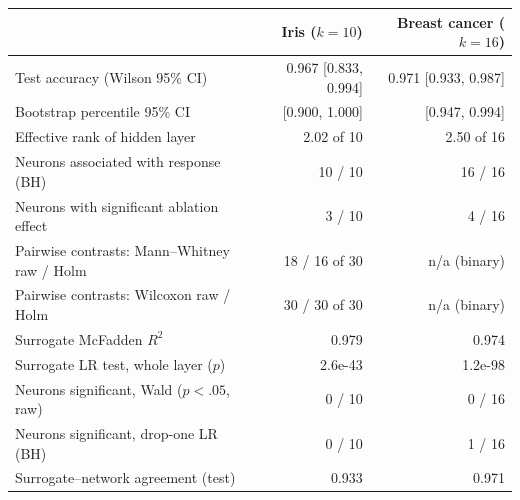 \begin{tabular}{lrr}\toprule
 & Iris ($k{=}10$) & Breast cancer ($k{=}16$)\\\midrule
Test accuracy (Wilson 95\% CI) & 0.967 [0.833, 0.994] & 0.971 [0.933, 0.987]\\
Bootstrap percentile 95\% CI & [0.900, 1.000] & [0.947, 0.994]\\
Effective rank of hidden layer & 2.02 of 10 & 2.50 of 16\\
Neurons associated with response (BH) & 10 / 10 & 16 / 16\\
Neurons with significant ablation effect & 3 / 10 & 4 / 16\\
Pairwise contrasts: Mann--Whitney raw / Holm & 18 / 16 of 30 & n/a (binary)\\
Pairwise contrasts: Wilcoxon raw / Holm & 30 / 30 of 30 & n/a (binary)\\
Surrogate McFadden $R^2$ & 0.979 & 0.974\\
Surrogate LR test, whole layer ($p$) & 2.6e-43 & 1.2e-98\\
Neurons significant, Wald ($p<.05$, raw) & 0 / 10 & 0 / 16\\
Neurons significant, drop-one LR (BH) & 0 / 10 & 1 / 16\\
Surrogate--network agreement (test) & 0.933 & 0.971\\
\bottomrule\end{tabular}
